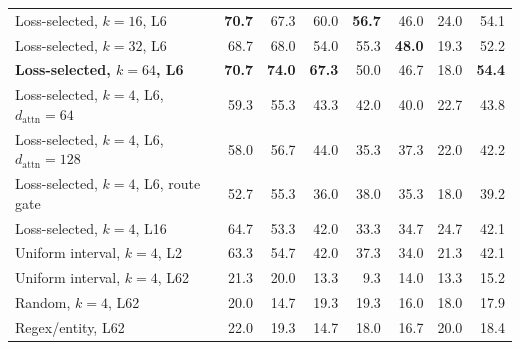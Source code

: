 \begin{table}[t]
\begin{tabular}{lrrrrrrr}
Loss-selected, $k=16$, L6 & \textbf{70.7} & 67.3 & 60.0 & \textbf{56.7} & 46.0 & 24.0 & 54.1 \\
Loss-selected, $k=32$, L6 & 68.7 & 68.0 & 54.0 & 55.3 & \textbf{48.0} & 19.3 & 52.2 \\
\textbf{Loss-selected, $k=64$, L6} & \textbf{70.7} & \textbf{74.0} & \textbf{67.3} & 50.0 & 46.7 & 18.0 & \textbf{54.4} \\
Loss-selected, $k=4$, L6, $d_{\mathrm{attn}}=64$ & 59.3 & 55.3 & 43.3 & 42.0 & 40.0 & 22.7 & 43.8 \\
Loss-selected, $k=4$, L6, $d_{\mathrm{attn}}=128$ & 58.0 & 56.7 & 44.0 & 35.3 & 37.3 & 22.0 & 42.2 \\
Loss-selected, $k=4$, L6, route gate & 52.7 & 55.3 & 36.0 & 38.0 & 35.3 & 18.0 & 39.2 \\
Loss-selected, $k=4$, L16 & 64.7 & 53.3 & 42.0 & 33.3 & 34.7 & 24.7 & 42.1 \\
Uniform interval, $k=4$, L2 & 63.3 & 54.7 & 42.0 & 37.3 & 34.0 & 21.3 & 42.1 \\
Uniform interval, $k=4$, L62 & 21.3 & 20.0 & 13.3 & 9.3 & 14.0 & 13.3 & 15.2 \\
Random, $k=4$, L62 & 20.0 & 14.7 & 19.3 & 19.3 & 16.0 & 18.0 & 17.9 \\
Regex/entity, L62 & 22.0 & 19.3 & 14.7 & 18.0 & 16.7 & 20.0 & 18.4 \\
\bottomrule
\end{tabular}
\end{table}
